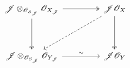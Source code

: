 \[
\begin{tikzcd}[column sep=4.5em, row sep=3.8em]
 \mathscr J\otimes_{\mathscr O_{S_{\mathscr J}}}
   \mathscr O_{X_{\mathscr J}}
   \arrow[r,two heads]
   \arrow[d,two heads]
 &
 \mathscr J\mathscr O_X
   \arrow[d,two heads]
   \arrow[dl,dashed]
 \\
 \mathscr J\otimes_{\mathscr O_{S_{\mathscr J}}}
   \mathscr O_{Y_{\mathscr J}}
   \arrow[r,"\sim"]
 &
 \mathscr J\mathscr O_Y
\end{tikzcd}
\]
